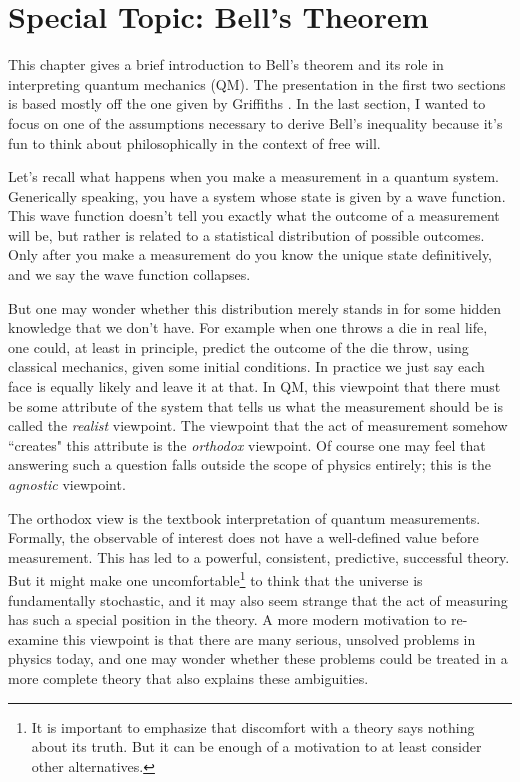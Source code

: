 \chapter{Special Topic: Bell's Theorem}\label{ap:bell}

This chapter gives a brief introduction to Bell's theorem and its role in
interpreting quantum mechanics (QM). The presentation in the first two sections
is based mostly off the one given by Griffiths 
\cite{griffiths_introduction_2005}. In the last section, I wanted to focus
on one of the assumptions necessary to derive Bell's inequality because
it's fun to think about philosophically in the context of free will.

Let's recall what happens when you make a measurement in a quantum system.
Generically speaking, you have a system whose state is given by a wave
function. This wave function doesn't tell you exactly what the
outcome of a measurement will be, but rather is related to a statistical
distribution of possible outcomes. Only after you make a measurement do
you know the unique state definitively, and we say the wave function collapses.

But one may wonder whether this distribution merely stands in for some
hidden knowledge that we don't have. For example when one throws a die
in real life, one could, at least in principle, predict the outcome of
the die throw, using classical mechanics, given some initial conditions.
In practice we just say each face is equally likely and leave it at that.
In QM, this viewpoint that there must be some attribute
of the system that tells us what the measurement should be is called
the {\it realist} viewpoint. The viewpoint that the act of measurement
somehow ``creates" this attribute is the {\it orthodox} viewpoint.
Of course one may feel that answering such a question falls outside the
scope of physics entirely; this is the {\it agnostic} viewpoint.

The orthodox view is the textbook interpretation of quantum
measurements. Formally, the observable of interest does not have a
well-defined value before measurement. This has led to a powerful,
consistent, predictive, successful theory. But it might make one 
uncomfortable\footnote{It is important to emphasize that discomfort
with a theory says nothing about its truth. But it can be enough of
a motivation to at least consider other alternatives.} to
think that the universe is fundamentally stochastic, and it
may also seem strange that the act of measuring has such a special
position in the theory. A more modern motivation to re-examine this
viewpoint is that there are many serious, unsolved problems in physics today,
and one may wonder whether these problems could be treated in a
more complete theory that also explains these ambiguities.

